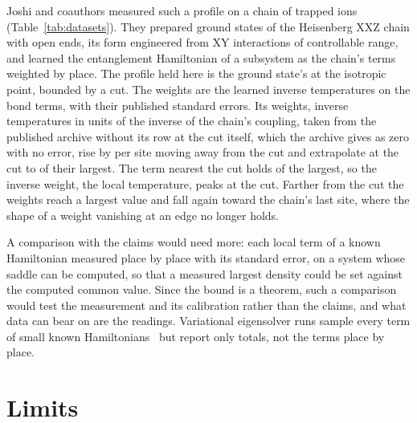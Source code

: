 \documentclass[aps,prd,reprint,superscriptaddress]{revtex4-2}
\begin{document}
Joshi and coauthors measured such a profile on a chain of trapped ions~\cite{JoshiEtAl2023} (Table~\ref{tab:datasets}). They prepared ground states of the Heisenberg XXZ chain with open ends, its form engineered from XY interactions of controllable range, and learned the entanglement Hamiltonian of a subsystem as the chain's terms weighted by place. The profile held here is the ground state's at the isotropic point, bounded by a cut. The weights are the learned inverse temperatures on the bond terms, with their published standard errors. Its weights, inverse temperatures in units of the inverse of the chain's coupling, taken from the published archive without its row at the cut itself, which the archive gives as zero with no error, rise by  per site moving away from the cut and extrapolate at the cut to  of their largest. The term nearest the cut holds  of the largest, so the inverse weight, the local temperature, peaks at the cut. Farther from the cut the weights reach a largest value and fall again toward the chain's last site, where the shape of a weight vanishing at an edge no longer holds.

A comparison with the claims would need more: each local term of a known Hamiltonian measured place by place with its standard error, on a system whose saddle can be computed, so that a measured largest density could be set against the computed common value. Since the bound is a theorem, such a comparison would test the measurement and its calibration rather than the claims, and what data can bear on are the readings. Variational eigensolver runs sample every term of small known Hamiltonians~\cite{KandalaEtAl2017} but report only totals, not the terms place by place.

\section{Limits}
\label{sec:limits}
\end{document}
